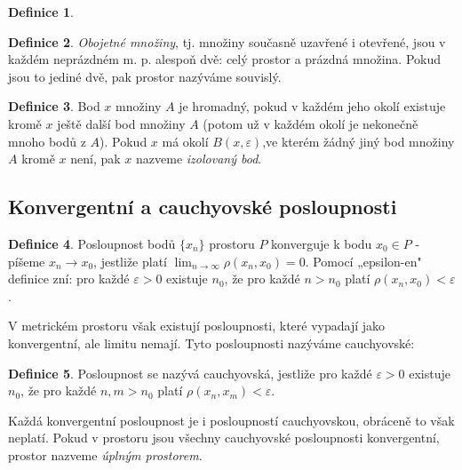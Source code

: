 \documentclass[a4]{report}
\theoremstyle{definition}
\newtheorem{definition}{Definice}[section]
\begin{document}
{\begin{definition}
\end{definition}
\begin{definition}\textit{Obojetné množiny}, tj. množiny současně uzavřené i otevřené, jsou v každém neprázdném m. p. alespoň dvě: celý prostor a prázdná množina. Pokud jsou to jediné dvě, pak prostor nazýváme souvislý. 
\end{definition}
\begin{definition}
Bod $x$ množiny $A$ je hromadný, pokud v každém jeho okolí existuje kromě $x$ ještě další bod množiny $A$ (potom už v každém okolí je nekonečně mnoho bodů z $A$). Pokud $x$ má okolí $B(x,\varepsilon)$,ve kterém žádný jiný bod množiny $A$ kromě $x$ není, pak $x$ nazveme \textit{izolovaný bod}.
\end{definition}
\subsection{Konvergentní a cauchyovské posloupnosti}
\begin{definition}
Posloupnost bodů $\{x_n\}$ prostoru $P$ konverguje k bodu $x_0 \in P$ - píšeme $x_n \rightarrow x_0$,
jestliže platí $\lim_{n\rightarrow\infty} \rho(x_n, x_0) = 0$. Pomocí „epsilon-en" definice zní: pro každé $\varepsilon > 0$ existuje $n_0$, že pro každé $n>n_0$ platí $\rho(x_n,x_0)<\varepsilon$. 
\end{definition}
V metrickém prostoru však existují posloupnosti, které vypadají jako konvergentní, ale limitu nemají. Tyto posloupnosti nazýváme cauchyovské: 
\begin{definition}
Posloupnost se nazývá cauchyovská, jestliže pro každé $\varepsilon>0$ existuje $n_0$, že pro každé $n, m > n_0$ platí $\rho(x_n,x_m)<\varepsilon$. 
\end{definition}
Každá konvergentní posloupnost je i posloupností cauchyovskou, obráceně to však neplatí.
Pokud v prostoru jsou všechny cauchyovské posloupnosti konvergentní, prostor nazveme
\textit{úplným prostorem}.

}
\end{document}
